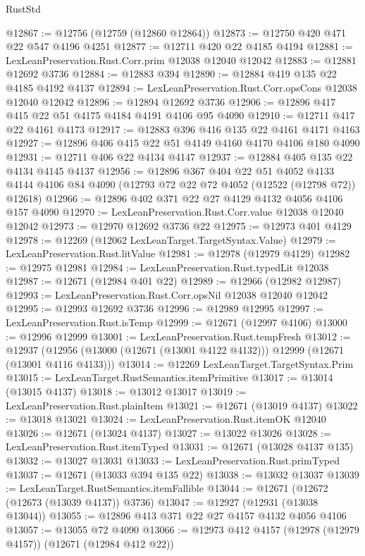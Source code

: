 \begin{lexlean}{RustStd}
\begin{coremodule}
@12867 := @12756 (@12759 (@12860 @12864))
@12873 := @12750 @420 @471 @22 @547 @4196 @4251
@12877 := @12711 @420 @22 @4185 @4194
@12881 := LexLeanPreservation.Rust.Corr.prim @12038 @12040 @12042
@12883 := @12881 @12692 @3736
@12884 := @12883 @394
@12890 := @12884 @419 @135 @22 @4185 @4192 @4137
@12894 := LexLeanPreservation.Rust.Corr.opsCons @12038 @12040 @12042
@12896 := @12894 @12692 @3736
@12906 := @12896 @417 @415 @22 @51 @4175 @4184 @4191 @4106 @95 @4090
@12910 := @12711 @417 @22 @4161 @4173
@12917 := @12883 @396 @416 @135 @22 @4161 @4171 @4163
@12927 := @12896 @406 @415 @22 @51 @4149 @4160 @4170 @4106 @180 @4090
@12931 := @12711 @406 @22 @4134 @4147
@12937 := @12884 @405 @135 @22 @4134 @4145 @4137
@12956 := @12896
    @367
    @404
    @22
    @51
    @4052
    @4133
    @4144
    @4106
    @84
    @4090
    (@12793 @72 @22 @72 @4052 (@12522 (@12798 @72)) @12618)
@12966 := @12896 @402 @371 @22 @27 @4129 @4132 @4056 @4106 @157 @4090
@12970 := LexLeanPreservation.Rust.Corr.value @12038 @12040 @12042
@12973 := @12970 @12692 @3736 @22
@12975 := @12973 @401 @4129
@12978 := @12269 (@12062 LexLeanTarget.TargetSyntax.Value)
@12979 := LexLeanPreservation.Rust.litValue
@12981 := @12978 (@12979 @4129)
@12982 := @12975 @12981
@12984 := LexLeanPreservation.Rust.typedLit @12038
@12987 := @12671 (@12984 @401 @22)
@12989 := @12966 (@12982 @12987)
@12993 := LexLeanPreservation.Rust.Corr.opsNil @12038 @12040 @12042
@12995 := @12993 @12692 @3736
@12996 := @12989 @12995
@12997 := LexLeanPreservation.Rust.isTemp
@12999 := @12671 (@12997 @4106)
@13000 := @12996 @12999
@13001 := LexLeanPreservation.Rust.tempFresh
@13012 := @12937
    (@12956 (@13000 (@12671 (@13001 @4122 @4132))) @12999 (@12671 (@13001 @4116 @4133)))
@13014 := @12269 LexLeanTarget.TargetSyntax.Prim
@13015 := LexLeanTarget.RustSemantics.itemPrimitive
@13017 := @13014 (@13015 @4137)
@13018 := @13012 @13017
@13019 := LexLeanPreservation.Rust.plainItem
@13021 := @12671 (@13019 @4137)
@13022 := @13018 @13021
@13024 := LexLeanPreservation.Rust.itemOK @12040
@13026 := @12671 (@13024 @4137)
@13027 := @13022 @13026
@13028 := LexLeanPreservation.Rust.itemTyped
@13031 := @12671 (@13028 @4137 @135)
@13032 := @13027 @13031
@13033 := LexLeanPreservation.Rust.primTyped
@13037 := @12671 (@13033 @394 @135 @22)
@13038 := @13032 @13037
@13039 := LexLeanTarget.RustSemantics.itemFallible
@13044 := @12671 (@12672 (@12673 (@13039 @4137)) @3736)
@13047 := @12927 (@12931 (@13038 @13044))
@13055 := @12896 @413 @371 @22 @27 @4157 @4132 @4056 @4106
@13057 := @13055 @72 @4090
@13066 := @12973 @412 @4157 (@12978 (@12979 @4157)) (@12671 (@12984 @412 @22))

\end{coremodule}
\end{lexlean}
